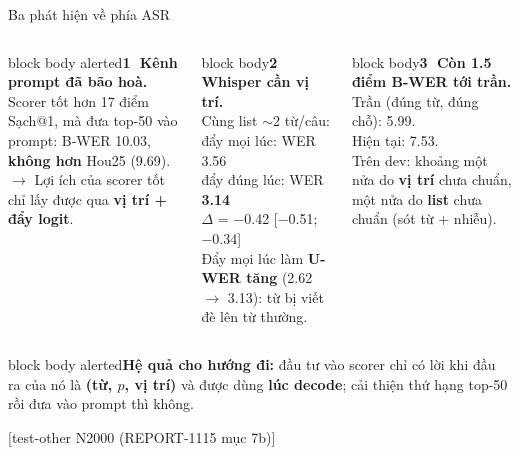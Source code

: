\documentclass[aspectratio=169,xcolor=table]{beamer}
\newcommand{\hi}[1]{\textcolor{Primary}{\textbf{#1}}}
\newcommand{\bad}[1]{\textcolor{RiskRed}{\textbf{#1}}}
\newcommand{\good}[1]{\textcolor{GoodGreen}{\textbf{#1}}}
\newcommand{\src}[1]{{\tiny\color{TextGray}[#1]}}
\newcommand{\ra}{$\rightarrow$}
\newcommand{\nbox}[2][block body]{\begin{beamercolorbox}[sep=0.45em,rounded=true]{#1}\footnotesize #2\end{beamercolorbox}}
\begin{document}
\begin{frame}{Ba phát hiện về phía ASR}
\begin{columns}[T]
\nbox[block body alerted]{\textbf{\textcircled{\scriptsize 1} Kênh prompt đã bão hoà.}\\[2pt]
Scorer tốt hơn 17 điểm Sạch@1, mà đưa top-50 vào prompt: B-WER 10.03, \bad{không hơn} Hou25 (9.69).\\[2pt]
\ra{} Lợi ích của scorer tốt chỉ lấy được qua \hi{vị trí + đẩy logit}.}
\nbox{\textbf{\textcircled{\scriptsize 2} Whisper cần vị trí.}\\[2pt]
Cùng list $\sim$2 từ/câu:\\
đẩy mọi lúc: WER 3.56\\
đẩy đúng lúc: WER \good{3.14}\\
$\Delta$ = $-$0.42 [$-$0.51; $-$0.34]\\[2pt]
Đẩy mọi lúc làm \bad{U-WER tăng} (2.62 \ra{} 3.13): từ bị viết đè lên từ thường.}
\nbox{\textbf{\textcircled{\scriptsize 3} Còn 1.5 điểm B-WER tới trần.}\\[2pt]
Trần (đúng từ, đúng chỗ): 5.99.\\
Hiện tại: 7.53.\\[2pt]
Trên dev: khoảng một nửa do \textbf{vị trí} chưa chuẩn, một nửa do \textbf{list} chưa chuẩn (sót từ + nhiễu).}
\end{columns}
\vspace{0.3cm}
\nbox[block body alerted]{\textbf{Hệ quả cho hướng đi:} đầu tư vào scorer chỉ có lời khi đầu ra của nó là \hi{(từ, $p$, vị trí)} và được dùng \hi{lúc decode}; cải thiện thứ hạng top-50 rồi đưa vào prompt thì không.}
\src{test-other N2000 (REPORT-1115 mục 7b)}
\end{frame}

\end{document}
